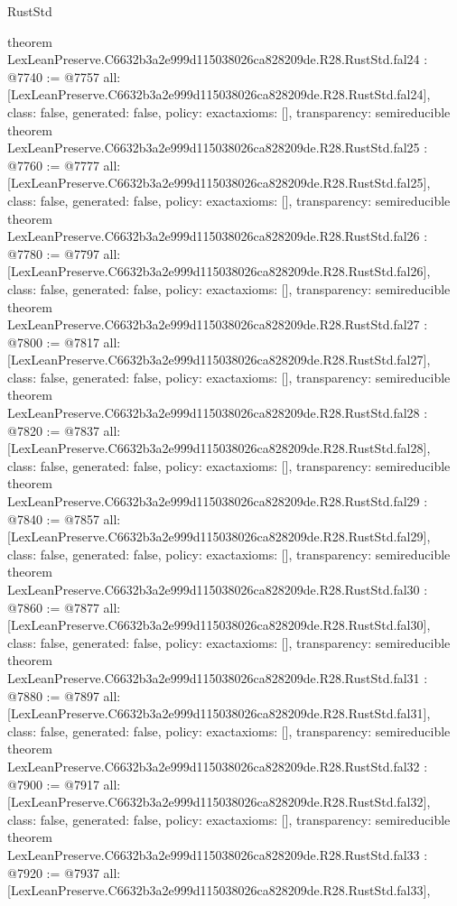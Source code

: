 \begin{lexlean}{RustStd}
\begin{coremodule}
{}
theorem LexLeanPreserve.C6632b3a2e999d115038026ca828209de.R28.RustStd.fal24 : @7740 := @7757 {
  all: [LexLeanPreserve.C6632b3a2e999d115038026ca828209de.R28.RustStd.fal24],
  class: false,
  generated: false,
  policy: exact{axioms: []},
  transparency: semireducible
}
theorem LexLeanPreserve.C6632b3a2e999d115038026ca828209de.R28.RustStd.fal25 : @7760 := @7777 {
  all: [LexLeanPreserve.C6632b3a2e999d115038026ca828209de.R28.RustStd.fal25],
  class: false,
  generated: false,
  policy: exact{axioms: []},
  transparency: semireducible
}
theorem LexLeanPreserve.C6632b3a2e999d115038026ca828209de.R28.RustStd.fal26 : @7780 := @7797 {
  all: [LexLeanPreserve.C6632b3a2e999d115038026ca828209de.R28.RustStd.fal26],
  class: false,
  generated: false,
  policy: exact{axioms: []},
  transparency: semireducible
}
theorem LexLeanPreserve.C6632b3a2e999d115038026ca828209de.R28.RustStd.fal27 : @7800 := @7817 {
  all: [LexLeanPreserve.C6632b3a2e999d115038026ca828209de.R28.RustStd.fal27],
  class: false,
  generated: false,
  policy: exact{axioms: []},
  transparency: semireducible
}
theorem LexLeanPreserve.C6632b3a2e999d115038026ca828209de.R28.RustStd.fal28 : @7820 := @7837 {
  all: [LexLeanPreserve.C6632b3a2e999d115038026ca828209de.R28.RustStd.fal28],
  class: false,
  generated: false,
  policy: exact{axioms: []},
  transparency: semireducible
}
theorem LexLeanPreserve.C6632b3a2e999d115038026ca828209de.R28.RustStd.fal29 : @7840 := @7857 {
  all: [LexLeanPreserve.C6632b3a2e999d115038026ca828209de.R28.RustStd.fal29],
  class: false,
  generated: false,
  policy: exact{axioms: []},
  transparency: semireducible
}
theorem LexLeanPreserve.C6632b3a2e999d115038026ca828209de.R28.RustStd.fal30 : @7860 := @7877 {
  all: [LexLeanPreserve.C6632b3a2e999d115038026ca828209de.R28.RustStd.fal30],
  class: false,
  generated: false,
  policy: exact{axioms: []},
  transparency: semireducible
}
theorem LexLeanPreserve.C6632b3a2e999d115038026ca828209de.R28.RustStd.fal31 : @7880 := @7897 {
  all: [LexLeanPreserve.C6632b3a2e999d115038026ca828209de.R28.RustStd.fal31],
  class: false,
  generated: false,
  policy: exact{axioms: []},
  transparency: semireducible
}
theorem LexLeanPreserve.C6632b3a2e999d115038026ca828209de.R28.RustStd.fal32 : @7900 := @7917 {
  all: [LexLeanPreserve.C6632b3a2e999d115038026ca828209de.R28.RustStd.fal32],
  class: false,
  generated: false,
  policy: exact{axioms: []},
  transparency: semireducible
}
theorem LexLeanPreserve.C6632b3a2e999d115038026ca828209de.R28.RustStd.fal33 : @7920 := @7937 {
  all: [LexLeanPreserve.C6632b3a2e999d115038026ca828209de.R28.RustStd.fal33],
}
\end{coremodule}
\end{lexlean}
